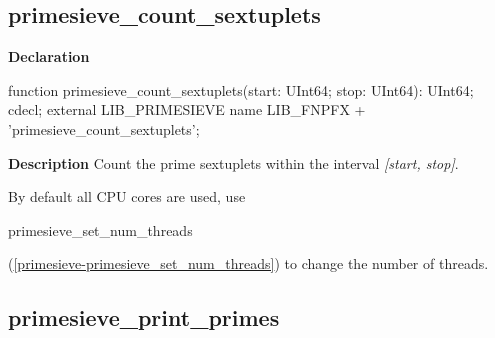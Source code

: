 \documentclass{report}
\newif\ifpdf
\begin{document}
\subsection*{primesieve{\_}count{\_}sextuplets}
\fi
\label{primesieve-primesieve_count_sextuplets}
\begin{list}{}{
\setlength{\itemindent}{0cm}
\setlength{\listparindent}{0cm}
\setlength{\leftmargin}{\evensidemargin}
\addtolength{\leftmargin}{\tmplength}
\settowidth{\labelsep}{X}
\addtolength{\leftmargin}{\labelsep}
\setlength{\labelwidth}{\tmplength}
}
\item[\textbf{Declaration}\hfill]
\ifpdf
\begin{flushleft}
\fi
\begin{ttfamily}
function primesieve{\_}count{\_}sextuplets(start: UInt64; stop: UInt64): UInt64; cdecl; external LIB{\_}PRIMESIEVE name LIB{\_}FNPFX + 'primesieve{\_}count{\_}sextuplets';\end{ttfamily}

\ifpdf
\end{flushleft}
\fi

\par
\item[\textbf{Description}]
Count the prime sextuplets within the interval \textit{[start, stop]}.

By default all CPU cores are used, use \begin{ttfamily}primesieve{\_}set{\_}num{\_}threads\end{ttfamily}(\ref{primesieve-primesieve_set_num_threads}) to change the number of threads.

\end{list}
\ifpdf
\subsection*{\large{\textbf{primesieve{\_}print{\_}primes}}\normalsize\hspace{1ex}\hrulefill}
\else
\end{document}
